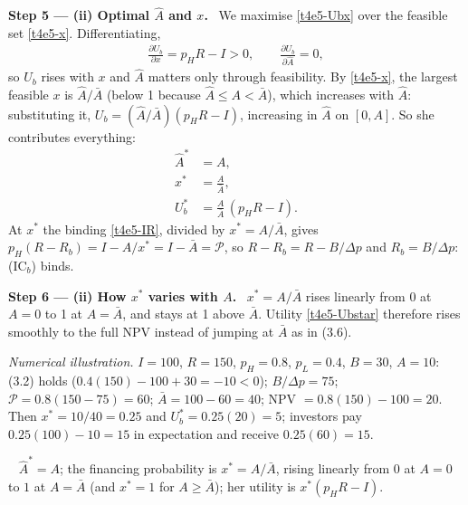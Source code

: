 \documentclass[11pt,a4paper]{article}
\newcommand{\step}[2]{\par\medskip\noindent\textbf{Step #1 --- #2.}~}
\newcommand{\answer}[1]{\par\smallskip\noindent\fbox{\textbf{Answer #1.}}~}
\begin{document}
\step{5}{(ii) Optimal $\hat A$ and $x$} We maximise \eqref{t4e5-Ubx} over the feasible set
\eqref{t4e5-x}. Differentiating,
\begin{align}
  \frac{\partial U_b}{\partial x} = p_H R-I>0, \qquad \frac{\partial U_b}{\partial \hat A}=0, \nonumber
\end{align}
so $U_b$ rises with $x$ and $\hat A$ matters only through feasibility. By \eqref{t4e5-x}, the
largest feasible $x$ is $\hat A/\bar A$ (below 1 because $\hat A\le A<\bar A$), which increases with
$\hat A$: substituting it, $U_b=(\hat A/\bar A)(p_HR-I)$, increasing in $\hat A$ on $[0,A]$. So
she contributes everything:
\begin{align}
  \hat A^* &= A, \nonumber\\
  x^* &= \frac{A}{\bar A}, \label{t4e5-xstar}\\
  U_b^* &= \frac{A}{\bar A}\,(p_H R-I). \label{t4e5-Ubstar}
\end{align}
At $x^*$ the binding \eqref{t4e5-IR}, divided by $x^*=A/\bar A$, gives
$p_H(R-R_b)=I-A/x^*=I-\bar A=\mathcal P$, so $R-R_b=R-B/\Delta p$ and $R_b=B/\Delta p$: (IC$_b$) binds.

\step{6}{(ii) How $x^*$ varies with $A$} $x^*=A/\bar A$ rises linearly from 0 at $A=0$ to 1 at
$A=\bar A$, and stays at 1 above $\bar A$. Utility \eqref{t4e5-Ubstar} therefore rises smoothly
to the full NPV instead of jumping at $\bar A$ as in (3.6).

\emph{Numerical illustration.} $I=100$, $R=150$, $p_H=0.8$, $p_L=0.4$, $B=30$, $A=10$: (3.2)
holds ($0.4(150)-100+30=-10<0$); $B/\Delta p=75$; $\mathcal P=0.8(150-75)=60$; $\bar A=100-60=40$;
NPV $=0.8(150)-100=20$. Then $x^*=10/40=0.25$ and $U_b^*=0.25(20)=5$; investors pay
$0.25(100)-10=15$ in expectation and receive $0.25(60)=15$.

\answer{(ii)} $\hat A^*=A$; the financing probability is $x^*=A/\bar A$, rising linearly from $0$
at $A=0$ to $1$ at $A=\bar A$ (and $x^*=1$ for $A\ge\bar A$); her utility is $x^*(p_HR-I)$.
\end{document}
